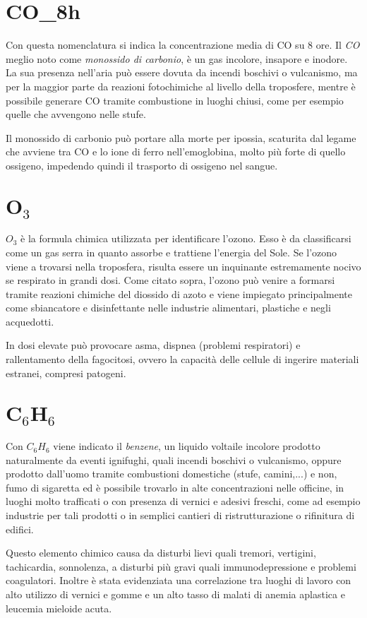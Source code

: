 \documentclass[12pt, letterpaper]{article}
\begin{document}
\section{CO\_8h}
Con questa nomenclatura si indica la concentrazione media di \textrm{CO} su 8 ore. Il \textit{CO} meglio noto come \textit{monossido di carbonio}, è un gas incolore, insapore e inodore. La sua presenza nell'aria può essere dovuta da incendi boschivi o vulcanismo, ma per la maggior parte da reazioni fotochimiche al livello della troposfere, mentre è possibile generare \textrm{CO} tramite combustione in luoghi chiusi, come per esempio quelle che avvengono nelle stufe.

Il monossido di carbonio può portare alla morte per ipossia, scaturita dal legame che avviene tra \textrm{CO} e lo ione di ferro nell'emoglobina, molto più forte di quello ossigeno, impedendo quindi il trasporto di ossigeno nel sangue.

\section{$\textbf{O}_{3}$}
$\textit{O}_{3}$ è la formula chimica utilizzata per identificare l'ozono. Esso è da classificarsi come un gas serra in quanto assorbe e trattiene l'energia del Sole. Se l'ozono viene a trovarsi nella troposfera, risulta essere un inquinante estremamente nocivo se respirato in grandi dosi. Come citato sopra, l'ozono può venire a formarsi tramite reazioni chimiche del diossido di azoto e viene impiegato principalmente come sbiancatore e disinfettante nelle industrie alimentari, plastiche e negli acquedotti.

In dosi elevate può provocare asma, dispnea (problemi respiratori) e rallentamento della fagocitosi, ovvero la capacità delle cellule di ingerire materiali estranei, compresi patogeni.

\section{$\textbf{C}_{6}\textbf{H}_{6}$}
Con $\textit{C}_{6}\textit{H}_{6}$ viene indicato il \textit{benzene}, un liquido voltaile incolore prodotto naturalmente da eventi ignifughi, quali incendi boschivi o vulcanismo, oppure prodotto dall'uomo tramite combustioni domestiche (stufe, camini,...) e non, fumo di sigaretta ed è possibile trovarlo in alte concentrazioni nelle officine, in luoghi molto trafficati o con presenza di vernici e adesivi freschi, come ad esempio industrie per tali prodotti o in semplici cantieri di ristrutturazione o rifinitura di edifici.

Questo elemento chimico causa da disturbi lievi quali tremori, vertigini, tachicardia, sonnolenza, a disturbi più gravi quali immunodepressione e problemi coagulatori. Inoltre è stata evidenziata una correlazione tra luoghi di lavoro con alto utilizzo di vernici e gomme e un alto tasso di malati di anemia aplastica e leucemia mieloide acuta.
\end{document}
